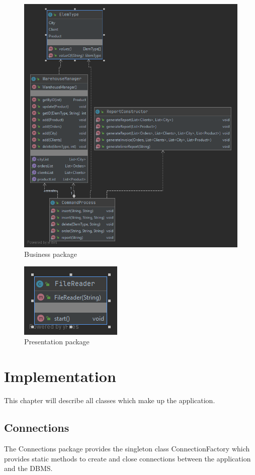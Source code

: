 \documentclass[10pt,a4paper]{article}
\begin{document}
\FloatBarrier
\begin{figure}[!htb]
\centering
\includegraphics[scale=0.40]{business.png}
\caption{Business package}
\end{figure}
\FloatBarrier
\begin{figure}[!htb]
\centering
\includegraphics[scale=0.40]{presentation.png}
\caption{Presentation package}
\end{figure}
\FloatBarrier
\pagebreak
\section{Implementation}
This chapter will describe all classes which make up the application.

\subsection{Connections}
The Connections package provides the singleton class ConnectionFactory which provides static methods to create and close connections between the application and the DBMS.
\end{document}
